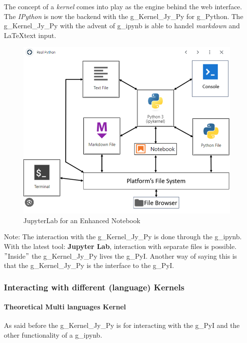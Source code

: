 The concept of a \textit{kernel} comes into play as the engine behind the web interface. The \textit{IPython} is now the backend with the \gls{g_Kernel_Jy_Py} for \gls{g_Python}. The \gls{g_Kernel_Jy_Py} with the advent of \gls{g_ipynb} is able to handel \textit{markdown} and \LaTeX text input.\\
\begin{figure}[H]
	\centering
	\includegraphics[scale = 0.3]{attachment/chapter_AML/Scc006}
	\caption{JupyterLab for an Enhanced Notebook}
\end{figure}
Note: The interaction with the \gls{g_Kernel_Jy_Py} is done through the \gls{g_ipynb}. With the latest tool: \textbf{Jupyter Lab}, interaction with separate files is possible.\\

$"$Inside$"$ the \gls{g_Kernel_Jy_Py} lives the \gls{g_PyI}. Another way of saying this is that the \gls{g_Kernel_Jy_Py} is the interface to the \gls{g_PyI}.

\subsubsection{Interacting with different (language) Kernels}
\paragraph{Theoretical Multi languages Kernel}
As said before the \gls{g_Kernel_Jy_Py} is for interacting with the \gls{g_PyI} and the other functionality of a \gls{g_ipynb}.\\

